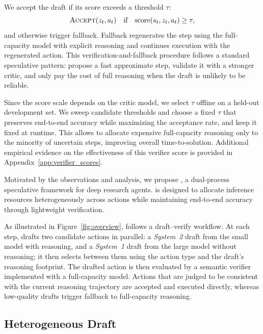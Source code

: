We accept the draft if its score exceeds a threshold $\tau$:
\begin{equation}
\textsc{Accept}(z_t, a_t)
\quad \text{if} \quad
\mathrm{score}(s_t, z_t, a_t) \ge \tau,
\label{eq:accept_rule}
\end{equation}
and otherwise trigger fallback.
Fallback regenerates the step using the full-capacity model with explicit reasoning and continues execution with the regenerated action.
This verification-and-fallback procedure follows a standard speculative pattern: propose a fast approximate step, validate it with a stronger critic, and only pay the cost of full reasoning when the draft is unlikely to be reliable.

Since the score scale depends on the critic model, we select $\tau$ offline on a held-out development set.
We sweep candidate thresholds and choose a fixed $\tau$ that preserves end-to-end accuracy while maximizing the acceptance rate, and keep it fixed at runtime.
This allows \method{} to allocate expensive full-capacity reasoning only to the minority of uncertain steps, improving overall time-to-solution. Additional empirical evidence on the effectiveness of this verifier score is provided in Appendix~\ref{app:verifier_scores}.




\iffalse

Motivated by the observations and analysis, we propose \method{}, a dual-process speculative framework for deep research agents.
\method{} is designed to allocate inference resources heterogeneously across actions while maintaining end-to-end accuracy through lightweight verification.

As illustrated in Figure~\ref{fig:overview}, \method{} follows a draft--verify workflow.
At each step, \method{} drafts two candidate actions in parallel: a \textit{System~2} draft from the small model with reasoning, and a \textit{System~1} draft from the large model without reasoning; it then selects between them using the action type and the draft’s reasoning footprint.
The drafted action is then evaluated by a semantic verifier implemented with a full-capacity model.
Actions that are judged to be consistent with the current reasoning trajectory are accepted and executed directly, whereas low-quality drafts trigger fallback to full-capacity reasoning.

\subsection{Heterogeneous Draft}
\label{subsec:hetero_draft}

